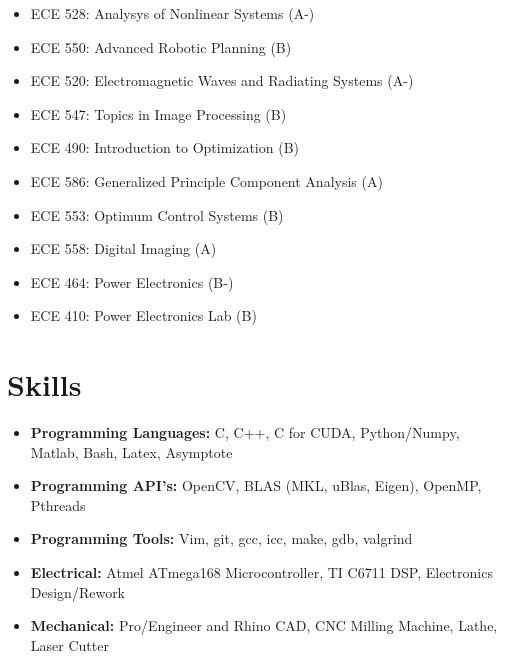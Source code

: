 \documentclass[line]{res}
\def\spaceline{\vspace{1mm} \fullline}
\begin{document}
\begin{resume}
\begin{itemize}
\begin{itemize}
\item ECE 528: Analysys of Nonlinear Systems (A-)
\item ECE 550: Advanced Robotic Planning (B)

\item ECE 520: Electromagnetic Waves and Radiating Systems (A-)
\item ECE 547: Topics in Image Processing (B)

\item ECE 490: Introduction to Optimization (B)
\item ECE 586: Generalized Principle Component Analysis (A)

\item ECE 553: Optimum Control Systems (B)
\item ECE 558: Digital Imaging (A)

\item ECE 464: Power Electronics (B-)
\item ECE 410: Power Electronics Lab (B)
\end{itemize}
\end{itemize}

	\vspace{-3mm}
	\section{Skills}
	\begin{itemize}
	\item 
	\spaceline
{\bf Programming Languages: } C, C++, C for CUDA, Python/Numpy, Matlab, Bash, Latex, Asymptote
\item {\bf Programming API's: } OpenCV, BLAS (MKL, uBlas, Eigen), OpenMP, Pthreads
\item {\bf Programming Tools: } Vim, git, gcc, icc, make, gdb, valgrind
\item {\bf Electrical: } Atmel ATmega168 Microcontroller, TI C6711 DSP, Electronics Design/Rework 
\item {\bf Mechanical: } Pro/Engineer and Rhino CAD, CNC Milling Machine, Lathe, Laser Cutter 
\end{itemize}

		\end{resume}
		
\end{document}
